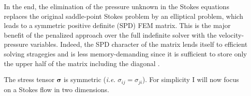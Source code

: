 In the end, the elimination of the pressure unknown in the Stokes equations
replaces the original saddle-point Stokes problem \cite{begl05} by an elliptical problem, 
which leads to a symmetric positive definite (SPD) FEM matrix. 
This is the major benefit of the penalized approach 
over the full indefinite solver with the velocity-pressure variables. Indeed, the SPD character of the matrix lends itself 
to efficient solving stragegies and is less memory-demanding since it is sufficient to store only the upper half of the matrix including the diagonal
\cite{gova}
.


The stress tensor ${\bm \sigma}$ is symmetric ({\it i.e.} $\sigma_{ij}=\sigma_{ji}$). For simplicity
I will now focus on a Stokes flow in two dimensions. 

